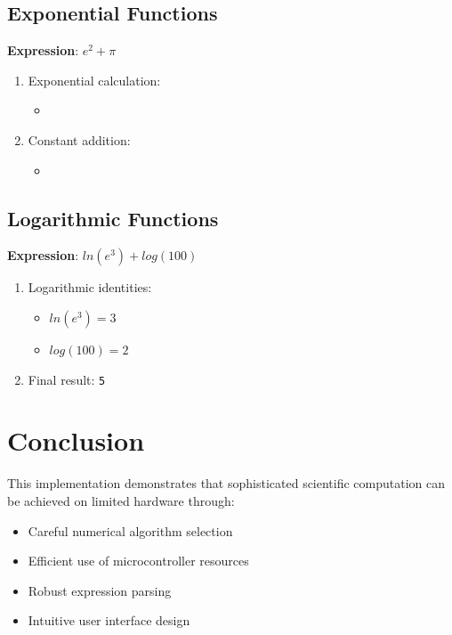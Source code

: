 \documentclass{article}
\begin{document}
\subsection{Exponential Functions}

\textbf{Expression}: \texttt{$e^2 + \pi$}

\begin{enumerate}
\item Exponential calculation:
  \begin{itemize}
  \item {}
  \end{itemize}
\item Constant addition:
  \begin{itemize}
  \item {}
  \end{itemize}
\end{enumerate}

\subsection{Logarithmic Functions}

\textbf{Expression}: \texttt{$ln(e^3) + log(100)$}

\begin{enumerate}
\item Logarithmic identities:
  \begin{itemize}
  \item \texttt{$ln(e^3) = 3$}
  \item \texttt{$log(100) = 2$}
  \end{itemize}
\item Final result: \texttt{5}
\end{enumerate}

\section{Conclusion}
This implementation demonstrates that sophisticated scientific computation can be achieved on limited hardware through:

\begin{itemize}
\item Careful numerical algorithm selection
\item Efficient use of microcontroller resources
\item Robust expression parsing
\item Intuitive user interface design
\end{itemize}
\end{document}
